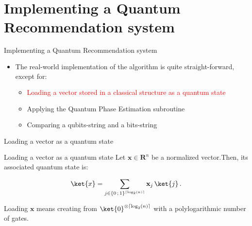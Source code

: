 \documentclass{beamer}
\begin{document}
\section{Implementing a Quantum Recommendation system}

\begin{frame}{Implementing a Quantum Recommendation system}
    \begin{itemize}
        \item The real-world implementation of the algorithm is quite straight-forward, except for:\pause
        \begin{itemize}
            \item \textcolor<5->{red}{Loading a vector stored in a classical structure as a quantum state}\pause
            \item Applying the Quantum Phase Estimation subroutine\pause
            \item Comparing a qubits-string and a bits-string
        \end{itemize}
    \end{itemize}
\end{frame}

\begin{frame}{Loading a vector as a quantum state}
    \begin{block}{Loading a vector as a quantum state}
        Let \(\mathbf{x}\in\mathbf{R}^n\) be a normalized vector.\pause Then, its associated quantum state is:
        
        \[\ket{x}=\sum_{j\in\{0\,;\,1\}^{\left\lceil\log_2(n)\right\rceil}}\mathbf{x}_j\,\ket{j}\,.\]\pause
        
        Loading $\mathbf{x}$ means creating  from $\ket{0}^{\otimes\left\lceil\log_2(n)\right\rceil}$ with a polylogarithmic number of gates\footnotemark.
    \end{block}
\end{frame}
\end{document}
